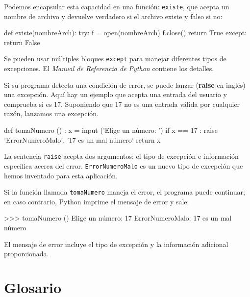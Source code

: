 Podemos encapsular esta capacidad en una función: \texttt{existe},
que acepta un nombre de archivo y devuelve verdadero si el archivo
existe y falso si no:
\begin{pythoncode}
def existe(nombreArch):
  try:
    f = open(nombreArch)
    f.close()
    return True
  except:
    return False
\end{pythoncode}
Se pueden usar múltiples bloques \texttt{except} para manejar diferentes
tipos de excepciones. El {\em Manual de Referencia de Python} contiene
los detalles.

Si su programa detecta una condición de error, se puede lanzar (\textbf{raise}
en inglés) una excepción. Aquí hay un ejemplo que acepta una entrada
del usuario y comprueba si es 17. Suponiendo que 17 no es una entrada
válida por cualquier razón, lanzamos una excepción.
\begin{pythoncode}
def tomaNumero () :                 
  x = input ('Elige un número: ')   
  if x == 17 :
    raise 'ErrorNumeroMalo', '17 es un mal número'
  return x
\end{pythoncode}

La sentencia \texttt{raise} acepta dos argumentos: el tipo de excepción
e información específica acerca del error. \texttt{ErrorNumeroMalo}
es un nuevo tipo de excepción que hemos inventado para esta aplicación.

Si la función llamada \texttt{tomaNumero} maneja el error, el programa
puede continuar; en caso contrario, Python imprime el mensaje de error
y sale:
\begin{pyconcode}
>>> tomaNumero ()
Elige un número: 17
ErrorNumeroMalo: 17 es un mal número
\end{pyconcode}

El mensaje de error incluye el tipo de excepción y la información
adicional proporcionada.

\section{Glosario}


